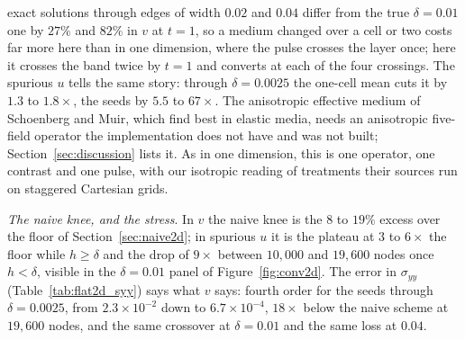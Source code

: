 \documentclass[11pt]{amsart}
\theoremstyle{definition}
\theoremstyle{remark}
\newcommand{\para}[1]{\par\smallskip\noindent\textit{#1}.\enspace}
\newcommand{\sci}[2]{\ensuremath{#1 \times 10^{#2}}}
\newcommand{\tablesetup}{\footnotesize\setlength{\tabcolsep}{2.5pt}%
  \renewcommand{\sci}[2]{\ensuremath{##1{\times}10^{##2}}}}
\begin{document}
exact solutions through edges of width $0.02$ and $0.04$ differ from the
true $\delta = 0.01$ one by $27\%$ and $82\%$ in $v$ at $t = 1$, so a
medium changed over a cell or two costs far more here than in one
dimension, where the pulse crosses the layer once; here it crosses the
band twice by $t = 1$ and converts at each of the four crossings. The
spurious $u$ tells the same story: through $\delta = 0.0025$ the
one-cell mean cuts it by $1.3$ to $1.8\times$, the seeds by $5.5$ to
$67\times$. The anisotropic effective medium of Schoenberg and Muir,
which \cite{KoeneWittstenRobertsson2022} find best in elastic media,
needs an anisotropic five-field operator the implementation does not
have and was not built; Section~\ref{sec:discussion} lists it. As in
one dimension, this is one operator, one contrast and one pulse, with
our isotropic reading of treatments their sources run on staggered
Cartesian grids.

\begin{table}
  \caption{The naive operator on a treated medium against the naive
  operator on the sampled medium: relative $\ell^2$ error in $v$ at
  $t = 1$ against the true medium's reference on the flat geometry (top)
  and the curved one (bottom), the rates between successive node sets,
  and the resolution floor. The seeds on the same node sets are in
  Tables~\ref{tab:flat2d_v} and~\ref{tab:curved2d_v}.}
  \label{tab:comparators2d}
  \centering
  \tablesetup
  
  \par\medskip
  
\end{table}

\para{The naive knee, and the stress}
In $v$ the naive knee is the $8$ to $19\%$ excess over the floor of
Section~\ref{sec:naive2d}; in spurious $u$ it is the plateau at $3$ to
$6\times$ the floor while $h \ge \delta$ and the drop of $9\times$
between $10{,}000$ and $19{,}600$ nodes once $h < \delta$, visible in the
$\delta = 0.01$ panel of Figure~\ref{fig:conv2d}. The error in
$\sigma_{yy}$ (Table~\ref{tab:flat2d_syy}) says what $v$ says: fourth
order for the seeds through $\delta = 0.0025$, from $2.3 \times 10^{-2}$
down to $6.7 \times 10^{-4}$, $18\times$ below the naive scheme at
$19{,}600$ nodes, and the same crossover at $\delta = 0.01$ and the same
loss at $0.04$.
\end{document}
